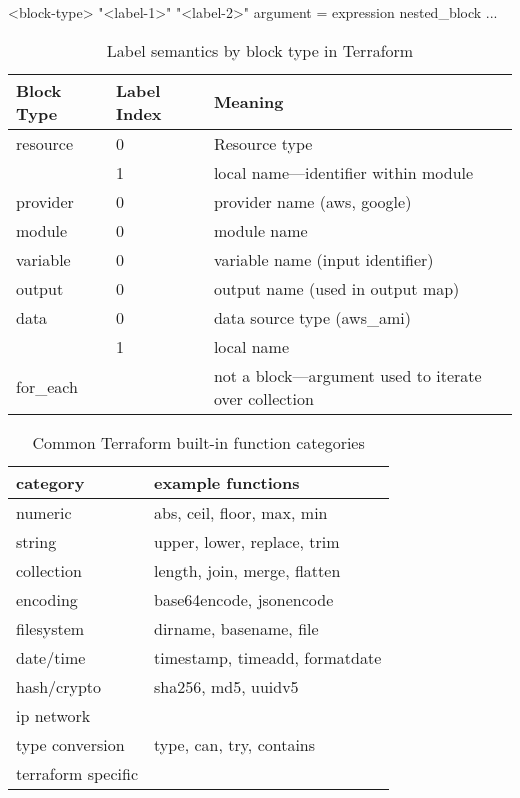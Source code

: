 \documentclass[openany, 12pt]{book}
\begin{document}
\begin{shell}{}
<block-type> "<label-1>" "<label-2>" {
    argument = expression
    nested_block {
        ... 
    }
}
\end{shell}

\begin{table}
	\centering
	\begin{tabular}{lll}
		\toprule
		{Block Type} & {Label Index} & {Meaning}                                              \\
		\midrule
		resource     & 0             & Resource type                                          \\
		             & 1             & local name---identifier within module                  \\
		provider     & 0             & provider name (aws, google)                            \\
		module       & 0             & module name                                            \\
		variable     & 0             & variable name (input identifier)                       \\
		output       & 0             & output name (used in output map)                       \\
		data         & 0             & data source type (aws\_ami)                            \\
		             & 1             & local name                                             \\
		for\_each    &               & not a block---argument used to iterate over collection \\
		\bottomrule
	\end{tabular}
	\caption{Label semantics by block type in Terraform}
\end{table}

\begin{table}[h!]
	\centering
	\begin{tabular}{ll}
		\toprule
		category           & example functions              \\
		\midrule
		numeric            & abs, ceil, floor, max, min     \\
		string             & upper, lower, replace, trim    \\
		collection         & length, join, merge, flatten   \\
		encoding           & base64encode, jsonencode       \\
		filesystem         & dirname, basename, file        \\
		date/time          & timestamp, timeadd, formatdate \\
		hash/crypto        & sha256, md5, uuidv5            \\
		ip network         &                                \\
		type conversion    & type, can, try, contains       \\
		terraform specific &                                \\
		\bottomrule
	\end{tabular}
	\caption{Common Terraform built-in function categories}
\end{table}
\end{document}
